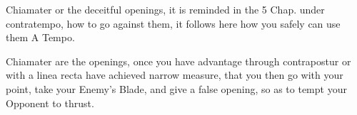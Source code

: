 

Chiamater or the deceitful openings, it is reminded in the 5 Chap. under
contratempo, how to go against them, it follows here how you safely
can use them A Tempo.


Chiamater are the openings, once you have advantage through contrapostur
or with a linea recta have achieved narrow measure, that you then go
with your point, take your Enemy's Blade, and give a false opening, so
as to tempt your Opponent to thrust.